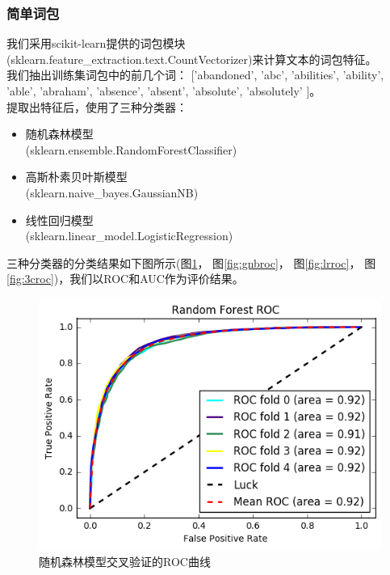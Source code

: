 \subsubsection{简单词包}
我们采用scikit-learn提供的词包模块(sklearn.feature\_extraction.text.CountVectorizer)来计算文本的词包特征。\\
我们抽出训练集词包中的前几个词： ['abandoned',
'abc',
'abilities',
'ability',
'able',
'abraham',
'absence',
'absent',
'absolute',
'absolutely'
]。\\

提取出特征后，使用了三种分类器：
\begin{itemize}
	\item
	  随机森林模型  \\
	  (sklearn.ensemble.RandomForestClassifier)
	\item
	  高斯朴素贝叶斯模型  \\
	  (sklearn.naive\_bayes.GaussianNB)
	\item
	  线性回归模型  \\
	  (sklearn.linear\_model.LogisticRegression)
\end{itemize}
三种分类器的分类结果如下图所示(图\ref{fig:rfroc}， 图\ref{fig:gnbroc}， 图\ref{fig:lrroc}， 图\ref{fig:3croc})，我们以ROC和AUC作为评价结果。
\begin{figure}[h]
\centering
\includegraphics[width=0.9\linewidth]{rf_roc}
\caption[rf_roc]{随机森林模型交叉验证的ROC曲线}
\label{fig:rfroc}
\end{figure}


